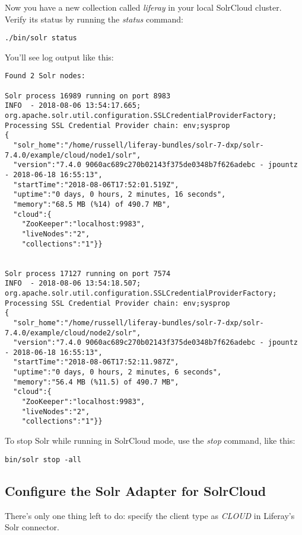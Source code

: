 Now you have a new collection called \emph{liferay} in your local
SolrCloud cluster. Verify its status by running the \emph{status}
command:

\begin{verbatim}
./bin/solr status
\end{verbatim}

You'll see log output like this:

\begin{verbatim}
Found 2 Solr nodes: 

Solr process 16989 running on port 8983
INFO  - 2018-08-06 13:54:17.665; org.apache.solr.util.configuration.SSLCredentialProviderFactory; Processing SSL Credential Provider chain: env;sysprop
{
  "solr_home":"/home/russell/liferay-bundles/solr-7-dxp/solr-7.4.0/example/cloud/node1/solr",
  "version":"7.4.0 9060ac689c270b02143f375de0348b7f626adebc - jpountz - 2018-06-18 16:55:13",
  "startTime":"2018-08-06T17:52:01.519Z",
  "uptime":"0 days, 0 hours, 2 minutes, 16 seconds",
  "memory":"68.5 MB (%14) of 490.7 MB",
  "cloud":{
    "ZooKeeper":"localhost:9983",
    "liveNodes":"2",
    "collections":"1"}}


Solr process 17127 running on port 7574
INFO  - 2018-08-06 13:54:18.507; org.apache.solr.util.configuration.SSLCredentialProviderFactory; Processing SSL Credential Provider chain: env;sysprop
{
  "solr_home":"/home/russell/liferay-bundles/solr-7-dxp/solr-7.4.0/example/cloud/node2/solr",
  "version":"7.4.0 9060ac689c270b02143f375de0348b7f626adebc - jpountz - 2018-06-18 16:55:13",
  "startTime":"2018-08-06T17:52:11.987Z",
  "uptime":"0 days, 0 hours, 2 minutes, 6 seconds",
  "memory":"56.4 MB (%11.5) of 490.7 MB",
  "cloud":{
    "ZooKeeper":"localhost:9983",
    "liveNodes":"2",
    "collections":"1"}}
\end{verbatim}

To stop Solr while running in SolrCloud mode, use the \emph{stop}
command, like this:

\begin{verbatim}
bin/solr stop -all
\end{verbatim}

\subsection{Configure the Solr Adapter for
SolrCloud}\label{configure-the-solr-adapter-for-solrcloud}

There's only one thing left to do: specify the client type as
\emph{CLOUD} in Liferay's Solr connector.

